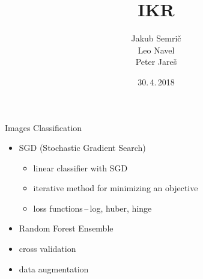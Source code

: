 \documentclass{beamer}
\title[]{IKR}
\author{Jakub Semrič \\ Leo Navel \\ Peter Jareš}
\institute{Brno University of Technology \\ Faculty of Information Technology}
\date{30.\,4.\,2018}
\begin{document}
\begin{frame}
\titlepage
\end{frame}

\begin{frame}{Images Classification}
    \begin{itemize}
        \item SGD (Stochastic Gradient Search)
        \begin{itemize}
            \item linear classifier with SGD
            \item iterative method for minimizing an objective
            \item loss functions\,--\,log, huber, hinge
        \end{itemize}
        \item Random Forest Ensemble
        \item cross validation
        \item data augmentation
    \end{itemize}
\end{frame}
\end{document}
